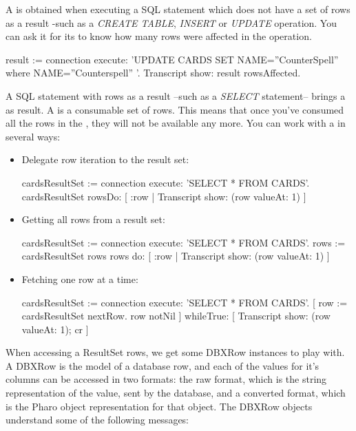 \documentclass[a4paper,10pt,twoside]{book}
\begin{document}
A  is obtained when executing a SQL statement which does not have a set of rows as a result -such as a \emph{CREATE TABLE}, \emph{INSERT} or \emph{UPDATE} operation.  You can ask it for its  to know how many rows were affected in the operation.

\begin{code}{}
result := connection execute: 'UPDATE CARDS SET NAME=''CounterSpell'' where NAME=''Counterspell'' '.
Transcript show: result rowsAffected.
\end{code}



A SQL statement with rows as a result --such as a \emph{SELECT} statement-- brings a  as result.  A  is a consumable set of rows.  This means that once you've consumed all the rows in the , they will not be available any more.  You can work with a  in several ways:

\begin{itemize}
\item Delegate row iteration to the result set:
\begin{code}{}
cardsResultSet := connection execute: 'SELECT * FROM CARDS'.
cardsResultSet rowsDo: [ :row | Transcript show: (row valueAt: 1) ]
\end{code}
\item Getting all rows from a result set:
\begin{code}{}
cardsResultSet := connection execute: 'SELECT * FROM CARDS'.
rows := cardsResultSet rows
rows do: [ :row | Transcript show: (row valueAt: 1) ]
\end{code}
\item Fetching one row at a time:
\begin{code}{}
cardsResultSet := connection execute: 'SELECT * FROM CARDS'.
[ row := cardsResultSet nextRow.
  row notNil ] 
    whileTrue: [ Transcript show: (row valueAt: 1); cr ]
\end{code}
\end{itemize}


When accessing a ResultSet rows, we get some DBXRow instances to play with.  A DBXRow is the model of a database row, and each of the values for it's columns can be accessed in two formats: the raw format, which is the string representation of the value, sent by the database, and a converted format, which is the Pharo object representation for that object.
The DBXRow objects understand some of the following messages:
\end{document}
